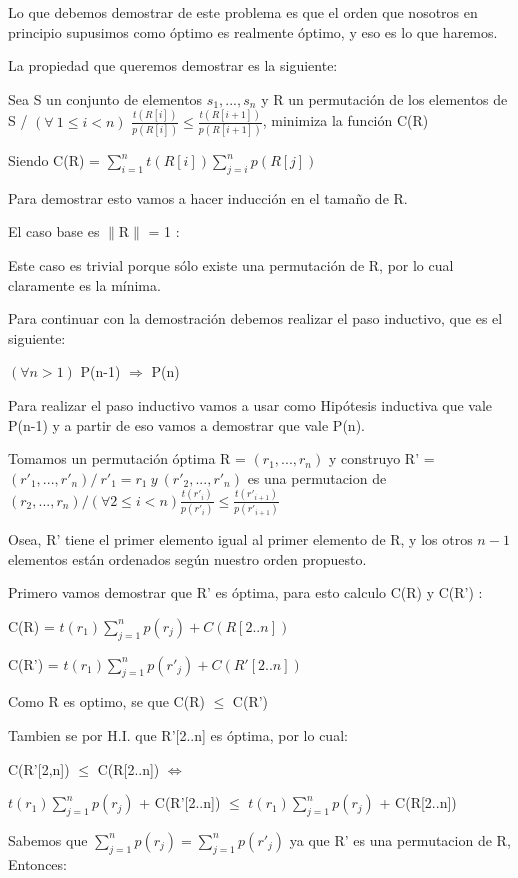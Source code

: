 Lo que debemos demostrar de este problema es que el orden que nosotros en principio supusimos como óptimo es realmente óptimo, y eso es lo que haremos.

La propiedad que queremos demostrar es la siguiente:

Sea S un conjunto de elementos  ${s_1,...,s_n}$ y R un permutación de los elementos de S / $(\forall \ 1 \leq i  < n)$ $\frac{t(R[i])}{p(R[i])} \leq \frac{t(R[i+1])}{p(R[i+1])} $, minimiza la función C(R) 

Siendo C(R) = $\sum_{i=1}^{n} t(R[i]) \sum_{j=i}^{n}p(R[j]) $

Para demostrar esto vamos a hacer inducción en el tamaño de R.

El caso base  es $\|$R$\|$ = 1 :

Este caso es trivial porque sólo existe una permutación de R, por lo cual claramente es la mínima.

Para continuar con la demostración debemos realizar el paso inductivo, que es el siguiente:

$(\forall n > 1)$  P(n-1) $\Rightarrow$ P(n)

Para realizar el paso inductivo vamos a usar como Hipótesis inductiva que vale P(n-1) y a partir de eso vamos a demostrar que vale P(n).

Tomamos un permutación óptima R = $(r_1,...,r_n)$ y construyo R' = $(r'_1,...,r'_n) / \  r'_1 = r_1 \  y \ (r'_2,...,r'_n)$ es una permutacion de $(r_2,...,r_n) / (\forall 2 \leq i  < n) \frac{t(r'_i)}{p(r'_i)} \leq \frac{t(r'_{i+1})}{p(r'_{i+1})} $

Osea, R' tiene el primer elemento igual al primer elemento de R, y los otros $n-1$ elementos están ordenados según nuestro orden propuesto.

Primero vamos demostrar que R' es óptima, para esto calculo C(R) y C(R') :

C(R) = $t(r_1) \sum_{j=1}^{n}p(r_j) + C(R[2..n]) $

C(R') = $t(r_1) \sum_{j=1}^{n}p(r'_j) + C(R'[2..n]) $

Como R es optimo, se que C(R) $\leq$ C(R')

Tambien se por H.I. que R'[2..n] es óptima, por lo cual: 

C(R'[2,n]) $\leq$ C(R[2..n]) $\iff$

$t(r_1) \sum_{j=1}^{n}p(r_j)$ + C(R'[2..n]) $\leq$  $t(r_1) \sum_{j=1}^{n}p(r_j)$ + C(R[2..n])

Sabemos que $\sum_{j=1}^{n}p(r_j) = \sum_{j=1}^{n}p(r'_j)$ ya que R' es una permutacion de R, Entonces:

